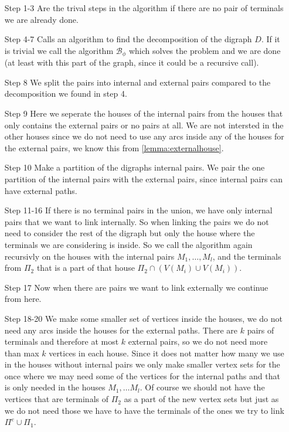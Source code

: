 \begin{itemize}
    \item[Step 1-3] Are the trival steps in the algorithm if there are no pair of terminals we are already done.
    \item[Step 4-7] Calls an algorithm to find the decomposition of the digraph $D$. 
    If it is trivial we call the algorithm $\mathcal{B}_\phi$ which solves the problem and we are done (at least with this part of the graph, since it could be a recursive call).
    \item[Step 8] We split the pairs into internal and external pairs compared to the decomposition we found in step 4.
    \item[Step 9] Here we seperate the houses of the internal pairs from the houses that only contains the external pairs or no pairs at all.
    We are not intersted in the other houses since we do not need to use any arcs inside any of the houses for the external pairs, we know this from \autoref{lemma:externalhouse}.
    \item[Step 10] Make a partition of the digraphs internal pairs. We pair the one partition of the internal pairs with the external pairs, since internal pairs can have external paths.
    \item[Step 11-16] If there is no terminal pairs in the union, we have only internal pairs that we want to link internally. 
    So when linking the pairs we do not need to consider the rest of the digraph but only the house where the terminals we are considering is inside. 
    So we call the algorithm again recursivly on the houses with the internal pairs $M_1,\dots , M_l$, and the terminals from $\Pi_2$ that is a part of that house $\Pi_2 \cap (V(M_i)\cup V(M_i))$. 
    \item[Step 17] Now when there are pairs we want to link externally we continue from here.
    \item[Step 18-20] We make some smaller set of vertices inside the houses, we do not need any arcs inside the houses for the external paths. 
    There are $k$ pairs of terminals and therefore at most $k$ external pairs, so we do not need more than max $k$ vertices in each house. Since it does not matter how many we use in the houses without internal pairs we only make smaller vertex sets for the once where we may need some of the vertices for the internal paths and that is only needed in the houses $M_1,\dots M_l$. 
    Of course we should not have the vertices that are terminals of $\Pi_2$ as a part of the new vertex sets but just as we do not need those we have to have the terminals of the ones we try to link $\Pi^e \cup \Pi_1$.

\end{itemize}
